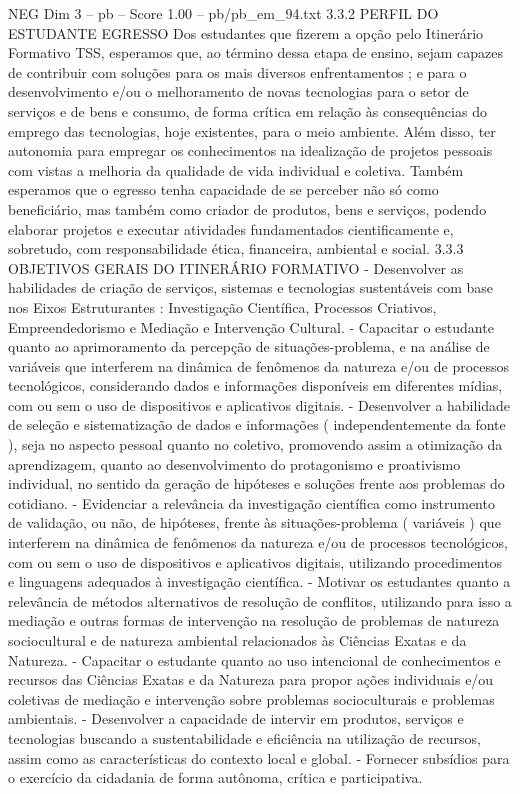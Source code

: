 \begin{textsample}{NEG Dim 3 – pb – Score 1.00 – pb/pb\_em\_94.txt}  \label{ex:f3_neg_202}
3.3.2 PERFIL DO ESTUDANTE EGRESSO Dos estudantes que fizerem a opção pelo Itinerário Formativo TSS, esperamos que, ao término dessa etapa de ensino, sejam capazes de contribuir com soluções para os mais diversos enfrentamentos ; e para o desenvolvimento e/ou o melhoramento de novas tecnologias para o setor de serviços e de bens e consumo, de forma crítica em relação às consequências do emprego das tecnologias, hoje existentes, para o meio ambiente.
Além disso, ter autonomia para empregar os conhecimentos na idealização de projetos pessoais com vistas a melhoria da qualidade de vida individual e coletiva.
Também esperamos que o egresso tenha capacidade de se perceber não só como beneficiário, mas também como criador de produtos, bens e serviços, podendo elaborar projetos e executar atividades fundamentados cientificamente e, sobretudo, com responsabilidade ética, financeira, ambiental e social. 3.3.3 OBJETIVOS GERAIS DO ITINERÁRIO FORMATIVO - Desenvolver as habilidades de criação de serviços, sistemas e tecnologias sustentáveis com base nos Eixos Estruturantes : Investigação Científica, Processos Criativos, Empreendedorismo e Mediação e Intervenção Cultural. - Capacitar o estudante quanto ao aprimoramento da percepção de situações-problema, e na análise de variáveis que interferem na dinâmica de fenômenos da natureza e/ou de processos tecnológicos, considerando dados e informações disponíveis em diferentes mídias, com ou sem o uso de dispositivos e aplicativos digitais. - Desenvolver a habilidade de seleção e sistematização de dados e informações ( independentemente da fonte ), seja no aspecto pessoal quanto no coletivo, promovendo assim a otimização da aprendizagem, quanto ao desenvolvimento do protagonismo e proativismo individual, no sentido da geração de hipóteses e soluções frente aos problemas do cotidiano. - Evidenciar a relevância da investigação científica como instrumento de validação, ou não, de hipóteses, frente às situações-problema ( variáveis ) que interferem na dinâmica de fenômenos da natureza e/ou de processos tecnológicos, com ou sem o uso de dispositivos e aplicativos digitais, utilizando procedimentos e linguagens adequados à investigação científica. - Motivar os estudantes quanto a relevância de métodos alternativos de resolução de conflitos, utilizando para isso a mediação e outras formas de intervenção na resolução de problemas de natureza sociocultural e de natureza ambiental relacionados às Ciências Exatas e da Natureza. - Capacitar o estudante quanto ao uso intencional de conhecimentos e recursos das Ciências Exatas e da Natureza para propor ações individuais e/ou coletivas de mediação e intervenção sobre problemas socioculturais e problemas ambientais. - Desenvolver a capacidade de intervir em produtos, serviços e tecnologias buscando a sustentabilidade e eficiência na utilização de recursos, assim como as características do contexto local e global. - Fornecer subsídios para o exercício da cidadania de forma autônoma, crítica e participativa.

\end{textsample}
